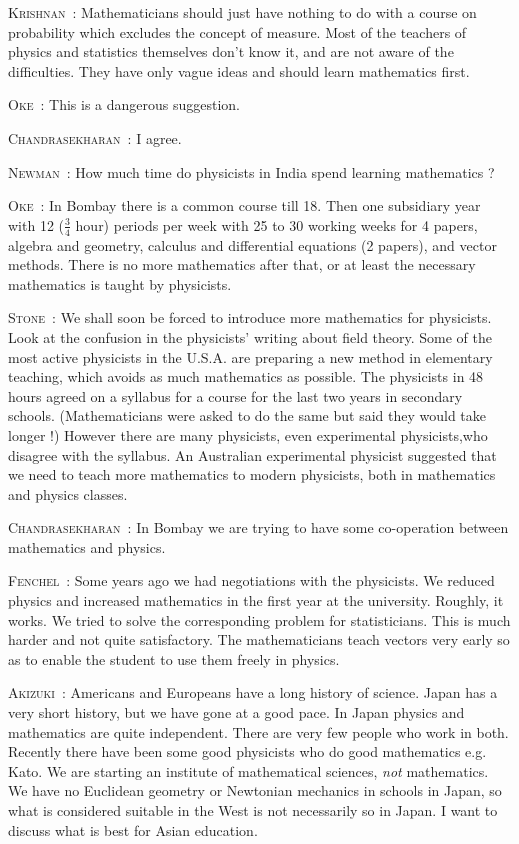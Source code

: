 \smallskip
\noindent
\textsc{Krishnan}~: Mathematicians should just have nothing to do with a course on probability which excludes the concept of measure. Most of the teachers of physics and statistics themselves don't know it, and are not aware of the difficulties. They have only vague ideas and should learn mathematics first.

\smallskip
\noindent
\textsc{Oke}~: This is a dangerous suggestion.

\smallskip
\noindent
\textsc{Chandrasekharan}~: I agree.

\smallskip
\noindent
\textsc{Newman}~: How much time do physicists in India spend learning mathematics ?

\smallskip
\noindent
\textsc{Oke}~: In Bombay there is a common course till 18. Then one subsidiary year with 12 ($\tfrac{3}{4}$ hour) periods per week with 25 to 30 working weeks for 4 papers, algebra and geometry, calculus and differential equations (2 papers), and vector methods. There is no more mathematics after that, or at least the necessary mathematics is taught by physicists.

\smallskip
\noindent
\textsc{Stone}~: We shall soon be forced to introduce more mathematics for physicists. Look at the confusion in the physicists' writing about field theory. Some of the most active physicists in the U.S.A. are preparing a new method in elementary teaching, which avoids as much mathematics as possible. The physicists in 48 hours agreed on a syllabus for a course for the last two years in secondary schools. (Mathematicians were asked to do the same but said they would take longer !) However there are many physicists, even experimental physicists,\pageoriginale who disagree with the syllabus. An Australian experimental physicist suggested that we need to teach more mathematics to modern physicists, both in mathematics and physics classes.

\smallskip
\noindent
\textsc{Chandrasekharan}~: In Bombay we are trying to have some co-operation between mathematics and physics.

\smallskip
\noindent
\textsc{Fenchel}~: Some years ago we had negotiations with the physicists. We reduced physics and increased mathematics in the first year at the university. Roughly, it works. We tried to solve the corresponding problem for statisticians. This is much harder and not quite satisfactory. The mathematicians teach vectors very early so as to enable the student to use them freely in physics.

\smallskip
\noindent
\textsc{Akizuki}~: Americans and Europeans have a long history of science. Japan has a very short history, but we have gone at a good pace. In Japan physics and mathematics are quite independent. There are very few people who work in both. Recently there have been some good physicists who do good mathematics e.g. Kato. We are starting an institute of mathematical sciences, {\em not} mathematics. We have no Euclidean geometry or Newtonian mechanics in schools in Japan, so what is considered suitable in the West is not necessarily so in Japan. I want to discuss what is best for Asian education.

